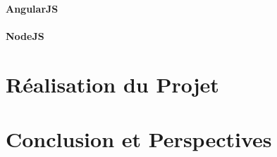 \documentclass[a4paper,11pt,oneside]{report}
\begin{document}
\subsubsection{AngularJS}

\subsubsection{NodeJS}

\newpage

\chapter{Réalisation du Projet}

\newpage

\chapter*{Conclusion et Perspectives}

\newpage

\renewcommand{\appendixtocname}{Annexes}
\end{document}
